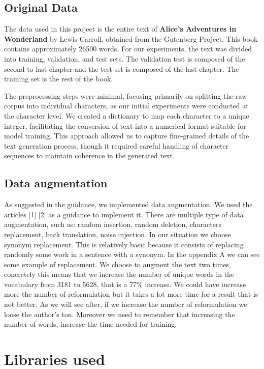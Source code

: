 \documentclass{article}
\begin{document}
\subsection{Original Data}

The data used in this project is the entire text of \textbf{Alice's Adventures in Wonderland} by Lewis Carroll, obtained from the Gutenberg Project. This book contains approximately 26500 words. For our experiments, the text was divided into training, validation, and test sets. The validation test is composed of the second to last chapter and the test set is composed of the last chapter. The training set is the rest of the book.

The preprocessing steps were minimal, focusing primarily on splitting the raw corpus into individual characters, as our initial experiments were conducted at the character level. We created a dictionary to map each character to a unique integer, facilitating the conversion of text into a numerical format suitable for model training. This approach allowed us to capture fine-grained details of the text generation process, though it required careful handling of character sequences to maintain coherence in the generated text.

\subsection{Data augmentation}

As suggested in the guidance, we implemented data augmentation. We used the articles [1] [2] as a guidance to implement it. There are multiple type of data augmentation, such as: random insertion, random deletion, characters replacement, back translation, noise injection. In our situation we choose synonym replacement. This is relatively basic because it consists of replacing randomly some work in a sentence with a synonym. In the appendix A we can see some example of replacement. We choose to augment the text two times, concretely this means that we increase the number of unique words in the vocabulary from 3181 to 5628, that is a 77\%  increase. We could have increase more the number of reformulation but it takes a lot more time for a result that is not better. As we will see after, if we increase the number of reformulation we loose the author's ton. Moreover we need to remember that increasing the number of words, increase the time needed for training.


\section{Libraries used}
\end{document}
